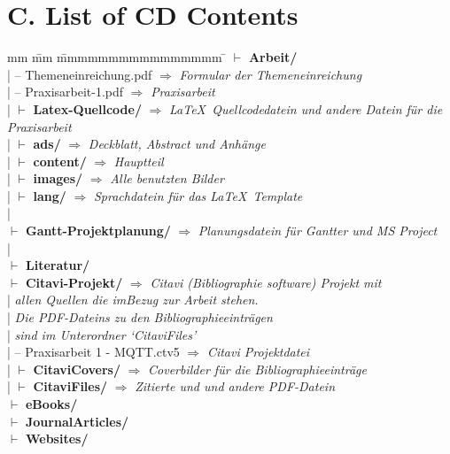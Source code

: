 \pagebreak
\section*{C. List of CD Contents}
\begin{tabbing}
	mm \= mm \= mmmmmmmmmmmmmmmm \= \kill
	$\vdash$ \textbf{Arbeit/} \\ %
	| \>  -- Themeneinreichung.pdf	$\Rightarrow$ \textit{Formular der Themeneinreichung}\\
	| \>  -- Praxisarbeit-1.pdf 	$\Rightarrow$ \textit{Praxisarbeit}\\
	| \>  $\vdash$ \textbf{Latex-Quellcode/}   $\Rightarrow$ \textit{\LaTeX~Quellcodedatein und andere Datein für die Praxisarbeit}\\ %
	| \> \>  $\vdash$  \textbf{ads/}   	\> $\Rightarrow$ \textit{Deckblatt, Abstract und Anhänge}\\
	| \> \>  $\vdash$  \textbf{content/}  \> $\Rightarrow$ \textit{Hauptteil}\\
	| \> \>  $\vdash$  \textbf{images/}   \> $\Rightarrow$ \textit{Alle benutzten Bilder}\\
	| \> \>  $\vdash$  \textbf{lang/}  \> $\Rightarrow$ \textit{Sprachdatein für das \LaTeX~Template}\\ %
	|\\
	$\vdash$ \textbf{Gantt-Projektplanung/} $\Rightarrow$ \textit{Planungsdatein für Gantter und MS Project}\\ %
	|\\
		$\vdash$ \textbf{Literatur/} \\ 
	\> $\vdash$ \textbf{Citavi-Projekt/} \> \> $\Rightarrow$ \textit{Citavi (Bibliographie software) Projekt mit}\\
	\> | \> \> \textit{allen Quellen die imBezug zur Arbeit stehen.} \\
	\> | \> \> \textit{Die PDF-Dateins zu den Bibliographieeinträgen} \\
	\> | \> \> \textit{sind im Unterordner `CitaviFiles'}\\
	\> | \>  --	Praxisarbeit 1 - MQTT.ctv5  \>  $\Rightarrow$ \textit{Citavi Projektdatei}\\
	\> | \>  $\vdash$ \textbf{CitaviCovers/} \>  $\Rightarrow$ \textit{Coverbilder für die Bibliographieeinträge}\\
	\> | \>  $\vdash$ \textbf{CitaviFiles/} \> $\Rightarrow$ \textit{Zitierte und und andere PDF-Datein}\\ %
	\> $\vdash$ \textbf{eBooks/} \\
	\> $\vdash$ \textbf{JournalArticles/} \\
	\> $\vdash$ \textbf{Websites/} \\ %
\end{tabbing}
